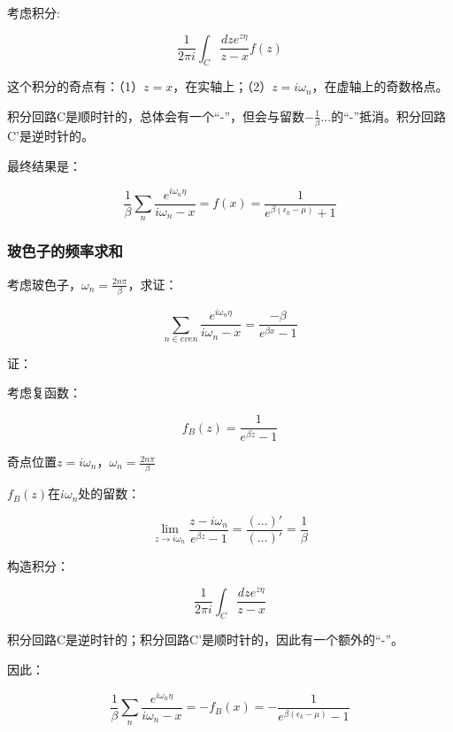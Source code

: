考虑积分:

\begin{equation*}
\frac{1}{2\pi i} \int_C \frac{ dz e^{z \eta} }{z -x} f(z)
\end{equation*}

这个积分的奇点有：（1）$z = x$，在实轴上；（2）$z = i \omega_n$，在虚轴上的奇数格点。

积分回路C是顺时针的，总体会有一个“-”，但会与留数$- \frac{ 1 }{\beta} ...$的“-”抵消。积分回路C'是逆时针的。

最终结果是：

\begin{equation}
\frac{1}{\beta} \sum\limits_n \frac{e^{i \omega_n \eta}}{ i \omega_n - x} = f(x) = \frac{1}{e^{\beta (\epsilon_k - \mu)} + 1 }
\end{equation}


\subsubsection{玻色子的频率求和}

考虑玻色子，$\omega_n = \frac{2n \pi}{\beta}$，求证：

\begin{equation}
\sum\limits_{n \in even} \frac{e^{i \omega_n \eta}}{i \omega_n - x } =\frac{- \beta}{ e^{\beta x} - 1 }
\end{equation}

证：

考虑复函数：

\begin{equation}
f_B (z)  = \frac{1}{e^{\beta z}  -1}
\end{equation}

奇点位置$z = i \omega_n$，$\omega_n = \frac{2n \pi}{ \beta}$

$f_B(z)$在$i \omega_n$处的留数：

\begin{equation*}
\lim\limits_{z \to i \omega_n}  \frac{z - i \omega_n}{ e^{\beta z }  - 1 } = \frac{(...)'}{(...)'} = \frac{1}{\beta}
\end{equation*}

构造积分：

\begin{equation}
\frac{1}{2 \pi i } \int_C \frac{dz e^{z \eta}} { z -x }
\end{equation}

积分回路C是逆时针的；积分回路C'是顺时针的，因此有一个额外的“-”。

因此：

\begin{equation*}
\frac{1}{\beta} \sum\limits_n \frac{ e^{i \omega_n \eta} } { i \omega_n - x } = - f_B (x) = - \frac{1}{e^{ \beta(\epsilon_k - \mu )} -1 }
\end{equation*}
